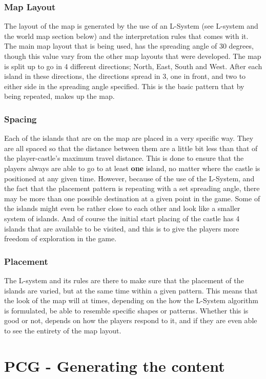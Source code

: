 \subsubsection{Map Layout}
The layout of the map is generated by the use of an L-System (see L-system and the world map section below) and the interpretation rules that comes with it. The main map layout that is being used, has the spreading angle of 30 degrees, though this value vary from the other map layouts that were developed. The map is split up to go in 4 different directions; North, East, South and West. After each island in these directions, the directions spread in 3, one in front, and two to either side in the spreading angle specified. This is the basic pattern that by being repeated, makes up the map.

\subsubsection{Spacing}
Each of the islands that are on the map are placed in a very specific way. They are all spaced so that the distance between them are a little bit less than that of the player-castle's maximum travel distance. This is done to ensure that the players always are able to go to at least \textbf{one} island, no matter where the castle is positioned at any given time. However, because of the use of the L-System, and the fact that the placement pattern is repeating with a set spreading angle, there may be more than one possible destination at a given point in the game. Some of the islands might even be rather close to each other and look like a smaller system of islands. And of course the initial start placing of the castle has 4 islands that are available to be visited, and this is to give the players more freedom of exploration in the game.

\subsubsection{Placement}
The L-system and its rules are there to make sure that the placement of the islands are varied, but at the same time within a given pattern. This means that the look of the map will at times, depending on the how the L-System algorithm is formulated, be able to resemble specific shapes or patterns. Whether this is good or not, depends on how the players respond to it, and if they are even able to see the entirety of the map layout.

\section{PCG - Generating the content}

